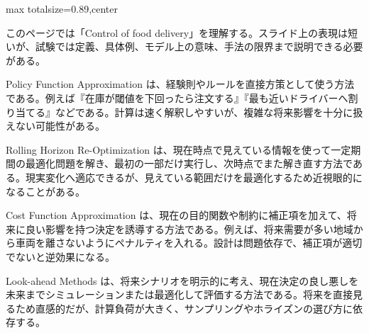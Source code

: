 \begin{minipage}[t]{0.58\textwidth}
\begin{adjustbox}{max totalsize={\textwidth}{0.89\textheight},center}
\begin{minipage}{\textwidth}\scriptsize
{}このページでは「Control of food delivery」を理解する。スライド上の表現は短いが、試験では定義、具体例、モデル上の意味、手法の限界まで説明できる必要がある。\par
Policy Function Approximation は、経験則やルールを直接方策として使う方法である。例えば『在庫が閾値を下回ったら注文する』『最も近いドライバーへ割り当てる』などである。計算は速く解釈しやすいが、複雑な将来影響を十分に扱えない可能性がある。\par
Rolling Horizon Re-Optimization は、現在時点で見えている情報を使って一定期間の最適化問題を解き、最初の一部だけ実行し、次時点でまた解き直す方法である。現実変化へ適応できるが、見えている範囲だけを最適化するため近視眼的になることがある。\par
Cost Function Approximation は、現在の目的関数や制約に補正項を加えて、将来に良い影響を持つ決定を誘導する方法である。例えば、将来需要が多い地域から車両を離さないようにペナルティを入れる。設計は問題依存で、補正項が適切でないと逆効果になる。\par
Look-ahead Methods は、将来シナリオを明示的に考え、現在決定の良し悪しを未来までシミュレーションまたは最適化して評価する方法である。将来を直接見るため直感的だが、計算負荷が大きく、サンプリングやホライズンの選び方に依存する。\par

\end{minipage}
\end{adjustbox}
\end{minipage}
